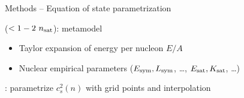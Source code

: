 \documentclass[usenames,dvipsnames,t]{beamer}
\begin{document}
\begin{frame}{Methods -- Equation of state parametrization}

  \def\x{3mm}
  \def\y{3mm}

    
   ($< 1-2 \ n_{\rm{sat}}$): metamodel~\cite{Margueron:2017eqc,Margueron:2017lup} 
  
  \begin{itemize}
    \vspace{\y}
    
    \item Taylor expansion of energy per nucleon $E/A$

    \vspace{\y}

    \item Nuclear empirical parameters ($E_{\rm{sym}}, L_{\rm{sym}}$, \dots, $E_{\rm{sat}}, K_{\rm{sat}}$, \dots)
  \end{itemize}

  \vspace{\x}

  : parametrize $c_s^2(n)$ with grid points and interpolation~\cite{Somasundaram:2021clp}


\end{frame}
\end{document}
